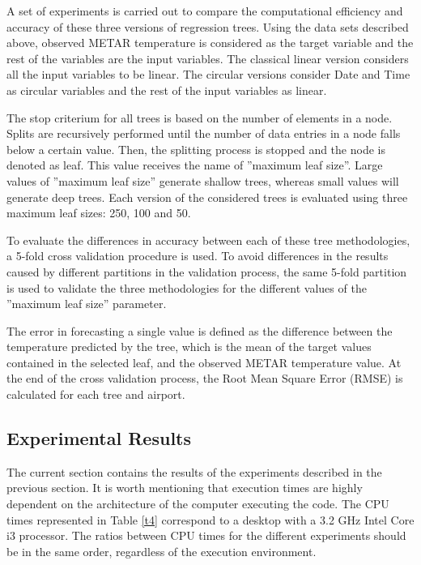 \documentclass[times,twocolumn,final,authoryear]{elsarticle}
\begin{document}
A set of experiments is carried out to compare the computational efficiency and accuracy of these three versions of regression trees. Using the data sets described above, observed METAR temperature is considered as the target variable and the rest of the variables are the input variables. The classical linear version considers all the input variables to be linear. The circular versions consider Date and Time as circular variables and the rest of the input variables as linear. 

The stop criterium for all trees is based on the number of elements in a node. Splits are recursively performed until the number of data entries in a node falls below a certain value. Then, the splitting process is stopped and the node is denoted as leaf. This value receives the name of ”maximum leaf size”. Large values of ”maximum leaf size” generate shallow trees, whereas small values will generate deep trees. Each version of the considered trees is evaluated using three maximum leaf sizes: 250, 100 and 50.

To evaluate the differences in accuracy between each of these tree methodologies, a 5-fold cross validation procedure is used. To avoid differences in the results caused by different partitions in the validation process, the same 5-fold partition is used to validate the three methodologies for the different values of the ”maximum leaf size” parameter.

The error in forecasting a single value is defined as the difference between the temperature predicted by the tree, which is the mean of the target values contained in the selected leaf, and the observed METAR temperature value. At the end of the cross validation process, the Root Mean Square Error (RMSE) is calculated for each tree and airport.


\subsection{Experimental Results}
\label{sec:4.3}

The current section contains the results of the experiments described in the previous section.
It is worth mentioning that execution times are highly dependent on the architecture of the computer executing the code. The CPU times represented in Table \ref{t4} correspond to a desktop with a 3.2 GHz Intel Core i3 processor. The ratios between CPU times for the different experiments should be in the same order, regardless of the execution environment.
\end{document}
